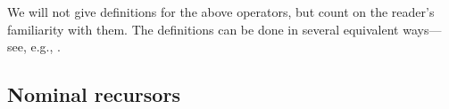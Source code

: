 We will not give definitions for the above operators, but count on the reader's familiarity with them.
 The definitions can be done in %
several equivalent ways---see, e.g., \cite{bar-lam,pitts-AlphaStructural}.  







\vspace*{-0.5ex}\subsection{Nominal recursors}
\label{subsec-nominalRec}

